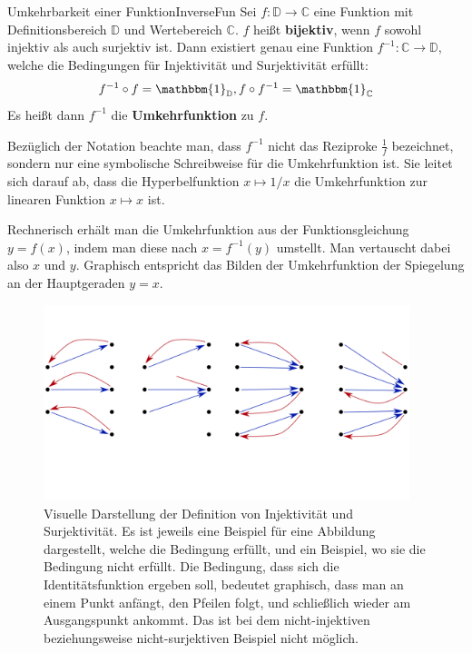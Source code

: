 \begin{statement}{Umkehrbarkeit einer Funktion}{InverseFun}
    Sei $f: \mathbb{D} \to \mathbb{C}$ eine Funktion mit Definitionsbereich $\mathbb{D}$ und Wertebereich $\mathbb{C}$. $f$ heißt \textbf{bijektiv}, wenn $f$ sowohl injektiv als auch surjektiv ist. Dann existiert genau eine Funktion $f^{-1}: \mathbb{C} \to \mathbb{D}$, welche die Bedingungen für Injektivität und Surjektivität erfüllt:
    $$
    f^{-1} \circ f = \mathbbm{1}_\mathbb{D}, f \circ f^{-1} = \mathbbm{1}_\mathbb{C}
    $$
    Es heißt dann $f^{-1}$ die \textbf{Umkehrfunktion} zu $f$.
\end{statement}

Bezüglich der Notation beachte man, dass $f^{-1}$ nicht das Reziproke $\frac{1}{f}$ bezeichnet, sondern nur eine symbolische Schreibweise für die Umkehrfunktion ist. Sie leitet sich darauf ab, dass die Hyperbelfunktion $x \mapsto 1/x$ die Umkehrfunktion zur linearen Funktion $x \mapsto x$ ist.

Rechnerisch erhält man die Umkehrfunktion aus der Funktionsgleichung $y = f(x)$, indem man diese nach $x = f^{-1}(y)$ umstellt. Man vertauscht dabei also $x$ und $y$. Graphisch entspricht das Bilden der Umkehrfunktion der Spiegelung an der Hauptgeraden $y=x$.

\begin{figure}
    \centering
    \includegraphics[width=0.95\textwidth]{./svg/injective-surjective}
    \caption[Injektivität und Surjektivität]{Visuelle Darstellung der Definition von Injektivität und Surjektivität. Es ist jeweils eine Beispiel für eine Abbildung dargestellt, welche die Bedingung erfüllt, und ein Beispiel, wo sie die Bedingung nicht erfüllt. Die Bedingung, dass sich die Identitätsfunktion ergeben soll, bedeutet graphisch, dass man an einem Punkt anfängt, den Pfeilen folgt, und schließlich wieder am Ausgangspunkt ankommt. Das ist bei dem nicht-injektiven beziehungsweise nicht-surjektiven Beispiel nicht möglich.}
    \label{fig:InjectSurject}
\end{figure}

